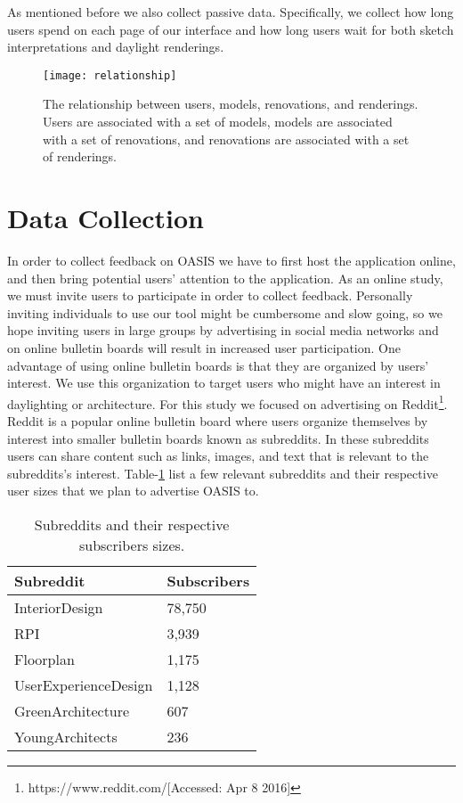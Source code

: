 				
As mentioned before we also collect passive data.  Specifically, we collect how long users spend on each page of our interface and how long users wait for both  sketch interpretations and daylight renderings.  \\

\begin{figure}[h]
\centering
\texttt{[image: relationship]}
\caption[The relationship between users, models, renovations, and renderings.]{The relationship between users, models, renovations, and renderings. Users are associated with a set of models, models are associated with a set of renovations, and renovations are associated with a set of renderings.}
\label{fig:rel}	
\end{figure}


\section{Data Collection}
In order to collect feedback on OASIS we have to first host the application online, and then bring potential users' attention to the application. As an online study, we must invite users to participate in order to collect feedback.  Personally inviting individuals to use our tool might be cumbersome and slow going, so we hope inviting users in large groups by advertising in social media networks and on online bulletin boards will result in increased user participation. One advantage of using online bulletin boards is that they are organized by users' interest.  We use this organization to target users who might have an interest in daylighting or architecture. For this study we focused on advertising on  Reddit\footnote{https://www.reddit.com/[Accessed: Apr 8 2016]}. Reddit is a popular online bulletin board where users organize themselves by interest into smaller bulletin boards known as subreddits. In these subreddits users can share content such as links, images, and text that is relevant to the subreddits's interest. Table-\ref{fig:reddit} list a few relevant subreddits and their respective user sizes that we plan to advertise OASIS to.  \\
	
\begin{table}[ht!]
\centering
\caption{Subreddits and their respective subscribers sizes.}
\label{fig:reddit}
\begin{tabular}{ | l | l | }
\hline
Subreddit               & Subscribers  \\ \hline
InteriorDesign 			& 78,750        \\ \hline
RPI 			        & 3,939         \\ \hline
Floorplan    			& 1,175         \\ \hline
UserExperienceDesign    & 1,128         \\ \hline
GreenArchitecture 		& 607          \\ \hline
YoungArchitects 		& 236          \\ \hline
\end{tabular}
\end{table}

